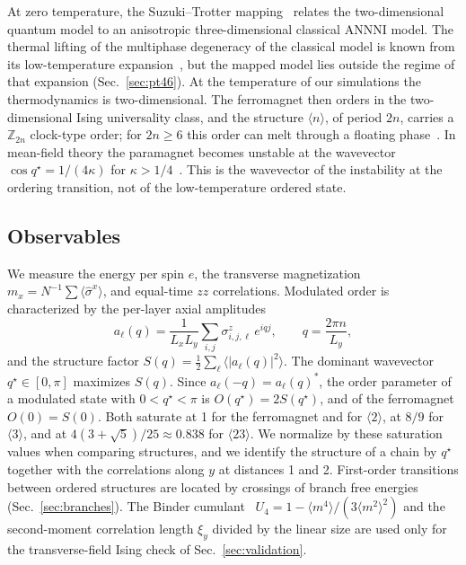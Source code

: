 \documentclass[
 aps,prb,
 twocolumn,
 superscriptaddress,
 longbibliography,
 nofootinbib,
 floatfix
]{revtex4-2}
\newcommand{\qs}{q^\star}
\begin{document}
At zero temperature, the Suzuki--Trotter mapping~\cite{suzuki1976relationship} relates the
two-dimensional quantum model to an anisotropic three-dimensional classical ANNNI model. The thermal
lifting of the multiphase degeneracy of the classical model is known from its low-temperature
expansion~\cite{fisher1980infinitely,fisher1981low}, but the mapped model lies outside the regime of that
expansion (Sec.~\ref{sec:pt46}). At the
temperature of our simulations the thermodynamics is two-dimensional. The ferromagnet then orders
in the two-dimensional Ising universality class, and the structure $\langle n\rangle$, of period
$2n$, carries a $\mathbb Z_{2n}$ clock-type order; for $2n\ge6$ this order can melt through a floating
phase~\cite{villain1981two,pokrovsky1979ground}.
In mean-field theory the paramagnet becomes unstable at the wavevector $\cos\qs=1/(4\kappa)$ for
$\kappa>1/4$~\cite{selke1988annni}. This is the wavevector of the instability at the ordering
transition, not of the low-temperature ordered state.

\subsection{Observables}
\label{sec:observables}

We measure the energy per spin $e$, the transverse magnetization
$m_x=N^{-1}\sum\langle\hat\sigma^x\rangle$, and equal-time $zz$ correlations. Modulated order is
characterized by the per-layer axial amplitudes
\begin{equation}
a_\ell(q)=\frac{1}{L_xL_y}\sum_{i,j}\sigma^z_{i,j,\ell}\,e^{iqj},\qquad q=\frac{2\pi n}{L_y},
\label{eq:aq}
\end{equation}
and the structure factor $S(q)=\frac12\sum_\ell\langle|a_\ell(q)|^2\rangle$. The dominant wavevector
$\qs\in[0,\pi]$ maximizes $S(q)$. Since $a_\ell(-q)=a_\ell(q)^*$, the order parameter of a modulated
state with $0<\qs<\pi$ is $O(\qs)=2S(\qs)$, and of the ferromagnet $O(0)=S(0)$. Both saturate at 1
for the ferromagnet and for $\langle2\rangle$, at $8/9$ for $\langle3\rangle$, and at
$4(3+\sqrt5)/25\approx0.838$ for $\langle23\rangle$. We normalize by these saturation values when comparing
structures, and we identify the structure of a chain by $\qs$ together with the correlations along $y$
at distances 1 and 2. First-order transitions between ordered structures are located by crossings of
branch free energies (Sec.~\ref{sec:branches}). The Binder cumulant~\cite{binder1981finite}
$U_4=1-\langle m^4\rangle/(3\langle m^2\rangle^2)$ and the second-moment correlation length $\xi_y$
divided by the linear size are used only for the transverse-field Ising check of
Sec.~\ref{sec:validation}.
\end{document}
